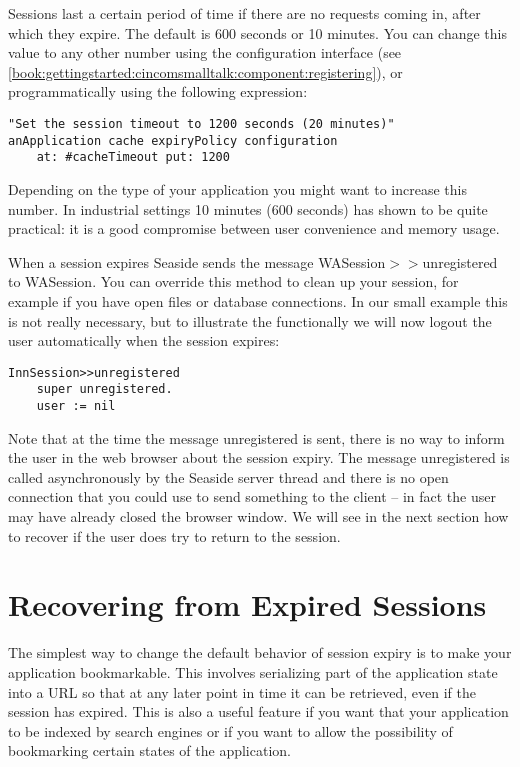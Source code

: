 \documentclass[a4paper,10pt,twoside]{book}
\newcommand{\ct}[1]{{\small\ttfamily\textup{#1}}}
\begin{document}
Sessions last a certain period of time if there are no requests coming in, after which they expire. The default is 600 seconds or 10 minutes. You can change this value to any other number using the configuration interface (see
\autoref{book:gettingstarted:cincomsmalltalk:component:registering}), or programmatically using the following expression:

\begin{lstlisting}
"Set the session timeout to 1200 seconds (20 minutes)"
anApplication cache expiryPolicy configuration 
    at: #cacheTimeout put: 1200
\end{lstlisting}

Depending on the type of your application you might want to increase this number. In industrial settings 10 minutes (600 seconds) has shown to be quite practical: it is a good compromise between user convenience and memory usage.

When a session expires Seaside sends the message \ct{WASession$>$$>$unregistered}  to \ct{WASession}. You can override this method to clean up your session, for example if you have open files or database connections. In our small example this is not really necessary, but to illustrate the functionally we will now logout the user automatically when the session expires:

\begin{lstlisting}
InnSession>>unregistered
    super unregistered.
    user := nil
\end{lstlisting}

Note that at the time the message \ct{unregistered} is sent, there is no way to inform the user in the web browser about the session expiry. The message \ct{unregistered} is called asynchronously by the Seaside server thread and there is no open connection that you could use to send something to the client -- in fact the user may have already closed the browser window. We will see in the next section how to recover if the user does try to return to the session.

\section{Recovering from Expired Sessions}
\label{book:inaction:session:recovering}

The simplest way to change the default behavior of session expiry is to make your application bookmarkable. This involves serializing part of the application state into a URL so that at any later point in time it can be retrieved, even if the session has expired. This is also a useful feature if you want that your application to be indexed by search engines or if you want to allow the possibility of bookmarking certain states of the application.
\end{document}
